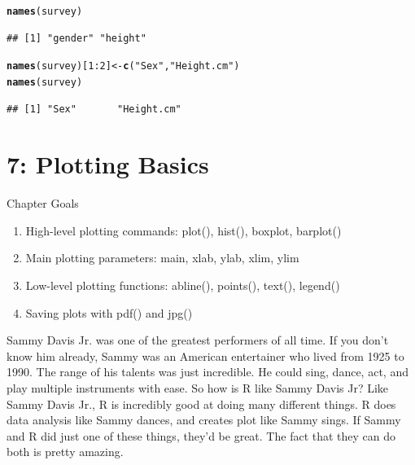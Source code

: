 \documentclass{tufte-book}\usepackage[]{graphicx}\usepackage[]{color}
\makeatletter
\newcommand{\hlnum}[1]{\textcolor[rgb]{0.686,0.059,0.569}{#1}}%
\newcommand{\hlstr}[1]{\textcolor[rgb]{0.192,0.494,0.8}{#1}}%
\newcommand{\hlopt}[1]{\textcolor[rgb]{0,0,0}{#1}}%
\newcommand{\hlstd}[1]{\textcolor[rgb]{0.345,0.345,0.345}{#1}}%
\newcommand{\hlkwb}[1]{\textcolor[rgb]{0.69,0.353,0.396}{#1}}%
\newcommand{\hlkwd}[1]{\textcolor[rgb]{0.737,0.353,0.396}{\textbf{#1}}}%
\newenvironment{kframe}{%
 \def\at@end@of@kframe{}%
 \ifinner\ifhmode%
  \def\at@end@of@kframe{\end{minipage}}%
  \begin{minipage}{\columnwidth}%
 \fi\fi%
 \def\FrameCommand##1{\hskip\@totalleftmargin \hskip-\fboxsep
 \colorbox{shadecolor}{##1}\hskip-\fboxsep
     \hskip-\linewidth \hskip-\@totalleftmargin \hskip\columnwidth}%
 \MakeFramed {\advance\hsize-\width
   \@totalleftmargin\z@ \linewidth\hsize
   \@setminipage}}%
 {\par\unskip\endMakeFramed%
 \at@end@of@kframe}
\newenvironment{knitrout}{}{} %
\makeatother
\begin{document}
\begin{footnotesize}
\begin{itemize}
\begin{footnotesize}
\begin{knitrout}
\color{fgcolor}\begin{kframe}
\begin{alltt}
\hlkwd{names}\hlstd{(survey)}
\end{alltt}
\begin{verbatim}
## [1] "gender" "height"
\end{verbatim}
\begin{alltt}
\hlkwd{names}\hlstd{(survey)[}\hlnum{1}\hlopt{:}\hlnum{2}\hlstd{]} \hlkwb{<-} \hlkwd{c}\hlstd{(}\hlstr{"Sex"}\hlstd{,} \hlstr{"Height.cm"}\hlstd{)}
\hlkwd{names}\hlstd{(survey)}
\end{alltt}
\begin{verbatim}
## [1] "Sex"       "Height.cm"
\end{verbatim}
\end{kframe}
\end{knitrout}
\end{footnotesize}

  
  



\end{itemize}

\chapter{7: Plotting Basics}
\label{ch:7}

Chapter Goals

\begin{enumerate}
  \item High-level plotting commands: plot(), hist(), boxplot, barplot()
  \item Main plotting parameters: main, xlab, ylab, xlim, ylim
  \item Low-level plotting functions: abline(), points(), text(), legend()
  \item Saving plots with pdf() and jpg()
\end{enumerate}

Sammy Davis Jr. was one of the greatest performers of all time. If you don't know him already, Sammy was an American entertainer who lived from 1925 to 1990. The range of his talents was just incredible. He could sing, dance, act, and play multiple instruments with ease. So how is R like Sammy Davis Jr? Like Sammy Davis Jr., R is incredibly good at doing many different things. R does data analysis like Sammy dances, and creates plot like Sammy sings. If Sammy and R did just one of these things, they'd be great. The fact that they can do both is pretty amazing.


\end{footnotesize}
\end{document}
